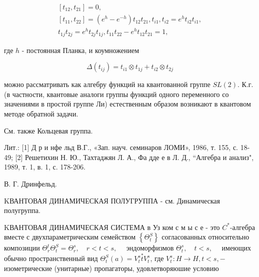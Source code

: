 \documentclass[10pt]{article}
\begin{document}
\[

\begin{gathered}

{\left[t_{12}, t_{21}\right]=0,} \\

{\left[t_{11}, t_{22}\right]=\left(e^{h}-e^{-h}\right) t_{12} t_{21}, t_{i 1}, t_{i 2}=e^{h} t_{i 2} t_{i 1},} \\

t_{1 j} t_{2 j}=e^{h} t_{2 j} t_{1 j}, t_{11} t_{22}-e^{h} t_{12} t_{21}=1,

\end{gathered}

\]



где $h$ - постоянная Планка, и коумножением



\[

\Delta\left(t_{i j}\right)=t_{i 1} \otimes t_{1 j}+t_{i 2} \otimes t_{2 j}

\]



можно рассматривать как алгебру функций на квантованной группе $S L(2)$. К.г. (в частности, квантовые аналоги группы функций одного переменного со значениями в простой группе Ли) естественным образом возникают в квантовом методе обратной задачи.



См. также Кольцевая группа.



Лит.: [1] Д р и нфе льд В.Г., «Зап. науч. семинаров ЛОМИ», 1986, т. 155, с. 18-49; [2] Решетихин Н. Ю., Тахтаджян Л. А., Фа дде е в Л. Д., “Алгебра и анализ", 1989, т. 1, в. 1, с. 178-206.



В. Г. Дринфельд.



KВАНТОВАЯ ДИНАМИЧЕСКАЯ ПОЛУГРУППА - см. Динамическая полугруппа.



KВАНТОВАЯ ДИНАМИЧЕСКАЯ СИСТЕМА в Уз ком с м ы с е - это $C^{*}$-алгебра вместе с двухпараметрическим семейством $\left\{\Theta_{t}^{S}\right\}$ согласованных относительно композиции $\Theta_{r}^{t} \Theta_{t}^{S}=\Theta_{r}^{s}, \quad r<t<s, \quad$ эндоморфизмов $\Theta_{t}^{s}, \quad t<s, \quad$ имеющих обычно пространственный вид $\Theta_{t}^{S}(a)=V_{t}^{s} \stackrel{*}{t} V_{t}^{s}$, где $V_{t}^{s}: H \rightarrow H, t<s,-$ изометрические (унитарные) пропагаторы, удовлетворяюшие условию
\end{document}
